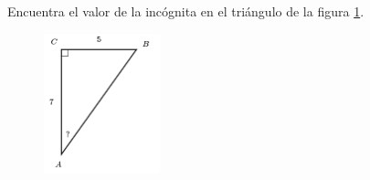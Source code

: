 \question[15]  Encuentra el valor de la incógnita en el triángulo de la figura \ref{fig:angle_functrig_30}.
\begin{figure}[H]
    \begin{center}
        \includegraphics[width=0.3\textwidth]{../images/angle_functrig_30.png}
    \end{center}
    \caption{}
    \label{fig:angle_functrig_30}
\end{figure}